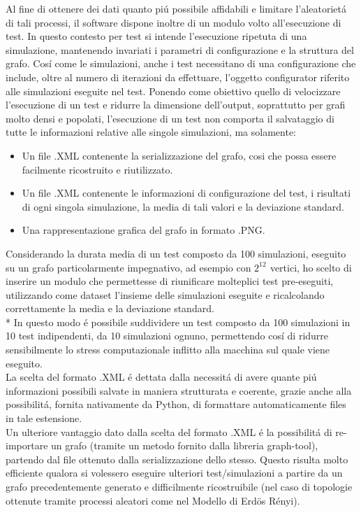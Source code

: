 \documentclass[../Tesi.tex]{subfiles}
\begin{document}
Al fine di ottenere dei dati quanto pi\'u possibile affidabili e limitare l'aleatoriet\'a di tali processi, il software dispone inoltre di un modulo volto all'esecuzione di test. In questo contesto per test si intende l'esecuzione ripetuta di una simulazione, mantenendo invariati i parametri di configurazione e la struttura del grafo. Cos\'i come le simulazioni, anche i test necessitano di una configurazione che include, oltre al numero di iterazioni da effettuare, l'oggetto configurator riferito alle simulazioni eseguite nel test.
Ponendo come obiettivo quello di velocizzare l'esecuzione di un test e ridurre la dimensione dell'output, soprattutto per grafi molto densi e popolati, l'esecuzione di un test non comporta il salvataggio di tutte le informazioni relative alle singole simulazioni, ma solamente:
\begin{itemize}
\item Un file .XML contenente la serializzazione del grafo, cosi che possa essere facilmente ricostruito e riutilizzato.
\item Un file .XML contenente le informazioni di configurazione del test, i risultati di ogni singola simulazione, la media di tali valori e la deviazione standard.
\item Una rappresentazione grafica del grafo in formato .PNG.
\end{itemize}
Considerando la durata media di un test composto da 100 simulazioni, eseguito su un grafo particolarmente impegnativo, ad esempio con $2^{12^{\mathrm{}}}$ vertici, ho scelto di inserire un modulo che permettesse di riunificare molteplici test pre-eseguiti, utilizzando come dataset l'insieme delle simulazioni eseguite e ricalcolando correttamente la media e la deviazione standard.\\*
In questo modo \'e possibile suddividere un test composto da 100 simulazioni in 10 test indipendenti, da 10 simulazioni ognuno, permettendo cos\'i di ridurre sensibilmente lo stress computazionale inflitto alla macchina sul quale viene eseguito.\\
La scelta del formato .XML \'e dettata dalla necessit\'a di avere quante pi\'u informazioni possibili salvate in maniera strutturata e coerente, grazie anche alla possibilit\'a, fornita nativamente da Python, di formattare automaticamente files in tale estensione.\\
Un ulteriore vantaggio dato dalla scelta del formato .XML \'e la possibilit\'a di re-importare un grafo (tramite un metodo fornito dalla libreria graph-tool), partendo dal file ottenuto dalla serializzazione dello stesso. Questo risulta molto efficiente qualora si volessero eseguire ulteriori test/simulazioni a partire da un grafo precedentemente generato e difficilmente ricostruibile (nel caso di topologie ottenute tramite processi aleatori come nel Modello di Erd{\"o}s R\'enyi).
\end{document}
